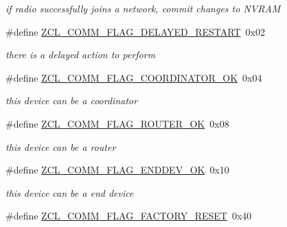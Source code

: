 \begin{DoxyCompactItemize}
\begin{DoxyCompactList}\small\item\em if radio successfully joins a network, commit changes to N\-V\-R\-A\-M \end{DoxyCompactList}\item 
\hypertarget{group__zcl__commissioning_gaa56ed48c4587dd4c657a1e69f7e2fba7}{\#define \hyperlink{group__zcl__commissioning_gaa56ed48c4587dd4c657a1e69f7e2fba7}{Z\-C\-L\-\_\-\-C\-O\-M\-M\-\_\-\-F\-L\-A\-G\-\_\-\-D\-E\-L\-A\-Y\-E\-D\-\_\-\-R\-E\-S\-T\-A\-R\-T}~0x02}\label{group__zcl__commissioning_gaa56ed48c4587dd4c657a1e69f7e2fba7}

\begin{DoxyCompactList}\small\item\em there is a delayed action to perform \end{DoxyCompactList}\item 
\hypertarget{group__zcl__commissioning_ga31a1726685fa4acfd6e27a00ba715e5d}{\#define \hyperlink{group__zcl__commissioning_ga31a1726685fa4acfd6e27a00ba715e5d}{Z\-C\-L\-\_\-\-C\-O\-M\-M\-\_\-\-F\-L\-A\-G\-\_\-\-C\-O\-O\-R\-D\-I\-N\-A\-T\-O\-R\-\_\-\-O\-K}~0x04}\label{group__zcl__commissioning_ga31a1726685fa4acfd6e27a00ba715e5d}

\begin{DoxyCompactList}\small\item\em this device can be a coordinator \end{DoxyCompactList}\item 
\hypertarget{group__zcl__commissioning_ga3f21ae380281a600718338c090dd7176}{\#define \hyperlink{group__zcl__commissioning_ga3f21ae380281a600718338c090dd7176}{Z\-C\-L\-\_\-\-C\-O\-M\-M\-\_\-\-F\-L\-A\-G\-\_\-\-R\-O\-U\-T\-E\-R\-\_\-\-O\-K}~0x08}\label{group__zcl__commissioning_ga3f21ae380281a600718338c090dd7176}

\begin{DoxyCompactList}\small\item\em this device can be a router \end{DoxyCompactList}\item 
\hypertarget{group__zcl__commissioning_gaccf2d6e723514ff49e123264a3cbde5a}{\#define \hyperlink{group__zcl__commissioning_gaccf2d6e723514ff49e123264a3cbde5a}{Z\-C\-L\-\_\-\-C\-O\-M\-M\-\_\-\-F\-L\-A\-G\-\_\-\-E\-N\-D\-D\-E\-V\-\_\-\-O\-K}~0x10}\label{group__zcl__commissioning_gaccf2d6e723514ff49e123264a3cbde5a}

\begin{DoxyCompactList}\small\item\em this device can be a end device \end{DoxyCompactList}\item 
\hypertarget{group__zcl__commissioning_ga656e9fbebbb767dd47a59363944a0ee4}{\#define \hyperlink{group__zcl__commissioning_ga656e9fbebbb767dd47a59363944a0ee4}{Z\-C\-L\-\_\-\-C\-O\-M\-M\-\_\-\-F\-L\-A\-G\-\_\-\-F\-A\-C\-T\-O\-R\-Y\-\_\-\-R\-E\-S\-E\-T}~0x40}\label{group__zcl__commissioning_ga656e9fbebbb767dd47a59363944a0ee4}


\end{DoxyCompactItemize}

